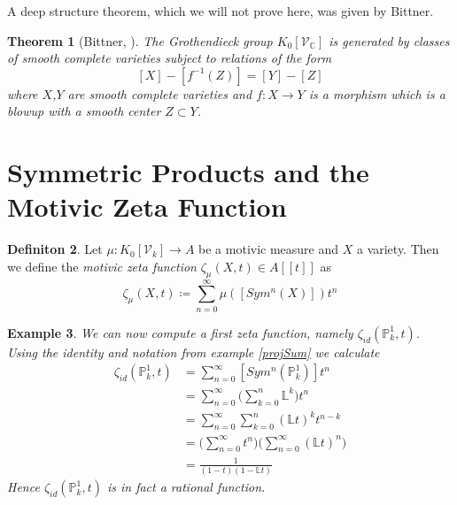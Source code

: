 \documentclass[11pt, a4paper, german]{article}
\theoremstyle{plain}
\newtheorem{theorem}{Theorem}
\newtheorem{example}[theorem]{Example}
\theoremstyle{definition}
\newtheorem{definition}[theorem]{Definiton}
\newcommand{\gring}[1][k]{K_0[\mathcal{V}_#1]}
\begin{document}
A deep structure theorem, which we will not prove here, was given by Bittner.

\begin{theorem}[Bittner, {\cite[Thm. 3.1]{Bittner}}] 
    The Grothendieck group $\gring[\mathbb{C}]$ is generated by classes of smooth complete varieties subject to relations of the form
    \[
        [X] - [f^{-1}(Z)] = [Y] - [Z]
    \]
    where $X$,$Y$ are smooth complete varieties and $f \colon X \to Y$ is a morphism which is a blowup with a smooth center $Z \subset Y$.
\end{theorem}


\section{Symmetric Products and the Motivic Zeta Function}

\begin{definition}
    Let $\mu \colon \gring \to A$ be a motivic measure and $X$ a variety. Then we define the \emph{motivic zeta function} 
    $\zeta_{\mu}(X,t) \in A[[t]]$ as
    \[
        \zeta_{\mu}(X,t) \coloneqq \sum_{n=0}^\infty \mu([Sym^n(X)])t^n
    \]
\end{definition}

\begin{example}
    We can now compute a first zeta function, namely $\zeta_{id}(\mathbb{P}_k^1, t)$. Using the identity and notation from example \ref{projSum}
    we calculate
    \begin{align*}
        \zeta_{id}(\mathbb{P}_k^1, t) & = \sum_{n=0}^\infty [Sym^n({\mathbb{P}_k^1})]t^n \\
                                      & = \sum_{n=0}^\infty \big(\sum_{k=0}^n \mathbb{L}^k\big) t^n \\
                                      & = \sum_{n=0}^\infty \sum_{k=0}^n (\mathbb{L}t)^k t^{n-k} \\
                                      & = \Big( \sum_{n=0}^\infty t^n \Big) \Big( \sum_{n=0}^\infty (\mathbb{L}t)^n \Big) \\
                                      & = \frac{1}{(1-t)(1-\mathbb{L}t)} %
    \end{align*}
    Hence $\zeta_{id}(\mathbb{P}_k^1, t)$ is in fact a rational function.
\end{example}
\end{document}
